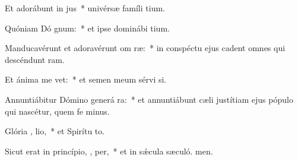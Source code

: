 \item Et adorábunt in  jus~* univérsæ famíli tium.
\item Quóniam Dó  gnum:~* et ipse dominábi tium.
\item Manducavérunt et adoravérunt om  ræ:~* in conspéctu ejus cadent omnes qui descéndunt  ram.
\item Et ánima me  vet:~* et semen meum sérvi si.
\item Annuntiábitur Dómino generá ra:~* et annuntiábunt cæli justítiam ejus pópulo qui nascétur, quem fe minus.
\item Glória ,  lio,~* et Spirítu to.
\item Sicut erat in princípio,  ,  per,~* et in sǽcula sæculó. men.

